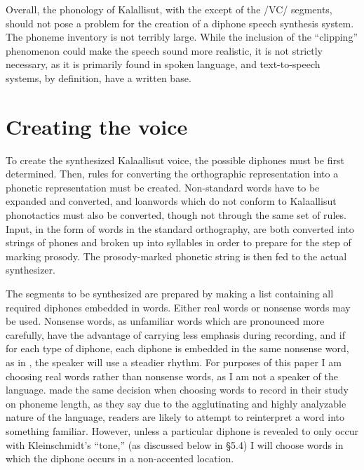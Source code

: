 \documentclass[12pt]{article}
\begin{document}
	Overall, the phonology of Kalallisut, with the except of the /V\textinvscr C/ segments, should not pose a problem for the creation of a diphone speech synthesis system. The phoneme inventory is not terribly large. While the inclusion of the ``clipping'' phenomenon could make the speech sound more realistic, it is not strictly necessary, as it is primarily found in spoken language, and text-to-speech systems, by definition, have a written base.\par

\section{Creating the voice}

To create the synthesized Kalaallisut voice, the possible diphones must be first determined. Then, rules for converting the orthographic representation into a phonetic representation must be created. Non-standard words have to be expanded and converted, and loanwords which do not conform to Kalaallisut phonotactics must also be converted, though not through the same set of rules. Input, in the form of words in the standard orthography, are both converted into strings of phones and broken up into syllables in order to prepare for the step of marking prosody. The prosody-marked phonetic string is then fed to the actual synthesizer. \par

The segments to be synthesized are prepared by making a list containing all required diphones embedded in words. Either real words or nonsense words may be used. Nonsense words, as unfamiliar words which are pronounced more carefully, have the advantage of carrying less emphasis during recording, and if for each type of diphone, each diphone is embedded in the same nonsense word, as in \citet{mongolian}, the speaker will use a steadier rhythm. For purposes of this paper I am choosing real words rather than nonsense words, as I am not a speaker of the language. \citet{quan} made the same decision when choosing words to record in their study on phoneme length, as they say due to the agglutinating and highly analyzable nature of the language, readers are likely to attempt to reinterpret a word into something familiar. However, unless a particular diphone is revealed to only occur with Kleinschmidt's ``tone,'' (as discussed below in \S 5.4) I will choose words in which the diphone occurs in a non-accented location.\par
\end{document}
